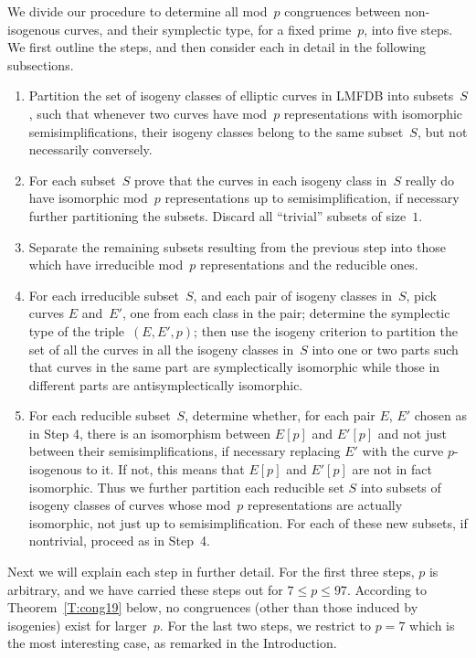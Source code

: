 \documentclass[12pt]{amsart}
\numberwithin{equation}{section}
\theoremstyle{definition}
\theoremstyle{remark}
\begin{document}
We divide our procedure to determine all mod~$p$ congruences between
non-isogenous curves, and their symplectic type, for a fixed
prime~$p$, into five steps.  We first outline the steps, and then
consider each in detail in the following subsections.
\begin{enumerate}[1.]
\item Partition the set of isogeny classes of elliptic curves in LMFDB
  into subsets~$S$, such that whenever two curves have mod~$p$
  representations with isomorphic semisimplifications, their isogeny
  classes belong to the same subset~$S$, but not necessarily
  conversely.
\item For each subset~$S$ prove that the curves in each isogeny class in~$S$ really
  do have isomorphic mod~$p$ representations up to
  semisimplification, if necessary further partitioning the subsets.
  Discard all ``trivial'' subsets of size~$1$.
\item Separate the remaining subsets resulting from the previous
  step into those which have irreducible mod~$p$ representations and
  the reducible ones.
\item For each irreducible subset~$S$, and each pair of isogeny
  classes in~$S$, pick curves $E$ and~$E'$, one from each class in the
  pair; determine the symplectic type of the triple~$(E,E',p)$; then
  use the isogeny criterion to partition the set of all the curves in
  all the isogeny classes in~$S$ into one or two parts such that curves
  in the same part are symplectically isomorphic while those in
  different parts are antisymplectically isomorphic.
\item For each reducible subset~$S$, determine whether, for each pair
  $E$, $E'$ chosen as in Step 4, there is an isomorphism between
  $E[p]$ and $E'[p]$ and not just between their semisimplifications,
  if necessary replacing $E'$ with the curve $p$-isogenous to it.  If
  not, this means that $E[p]$ and $E'[p]$ are not in fact isomorphic.
  Thus we further partition each reducible set $S$ into subsets of
  isogeny classes of curves whose mod~$p$ representations are actually
  isomorphic, not just up to semisimplification.  For each of these
  new subsets, if nontrivial, proceed as in Step~4.

\end{enumerate}
Next we will explain each step in further detail.  For the first three
steps, $p$ is arbitrary, and we have carried these steps out for $7\le
p\le97$.  According to Theorem~\ref{T:cong19} below, no congruences
(other than those induced by isogenies) exist for larger~$p$.  For the
last two steps, we restrict to $p=7$ which is the most interesting
case, as remarked in the Introduction.
\end{document}

